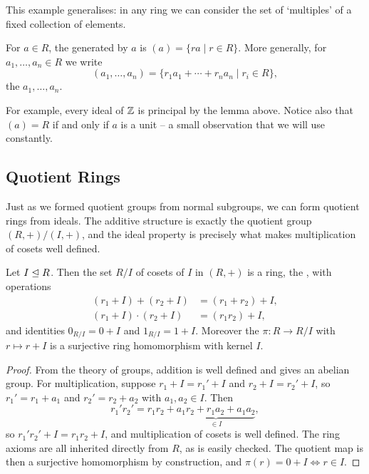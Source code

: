 \documentclass[a4paper]{scrartcl}
\begin{document}
This example generalises: in any ring we can consider the set of `multiples' of a fixed collection of elements.

\begin{definition}
	For $a \in R$, the  generated by $a$ is $(a) = \{ra \mid r \in R\}$. More generally, for $a_1, \dots, a_n \in R$ we write
	$$
	(a_1, \dots, a_n) = \{r_1 a_1 + \cdots + r_n a_n \mid r_i \in R\},
	$$
	the  $a_1, \dots, a_n$.
\end{definition}

For example, every ideal of $\mathbb{Z}$ is principal by the lemma above. Notice also that $(a) = R$ if and only if $a$ is a unit -- a small observation that we will use constantly.

\subsection{Quotient Rings}

Just as we formed quotient groups from normal subgroups, we can form quotient rings from ideals. The additive structure is exactly the quotient group $(R, +)/(I, +)$, and the ideal property is precisely what makes multiplication of cosets well defined.

\begin{theorem}
	Let $I \trianglelefteq R$. Then the set $R/I$ of cosets of $I$ in $(R, +)$ is a ring, the , with operations
	\begin{align*}
		(r_1 + I) + (r_2 + I) &= (r_1 + r_2) + I, \\
		(r_1 + I) \cdot (r_2 + I) &= (r_1 r_2) + I,
	\end{align*}
	and identities $0_{R/I} = 0 + I$ and $1_{R/I} = 1 + I$. Moreover the  $\pi: R \rightarrow R/I$ with $r \mapsto r + I$ is a surjective ring homomorphism with kernel $I$.
\end{theorem}
\begin{proof}
	From the theory of groups, addition is well defined and gives an abelian group. For multiplication, suppose $r_1 + I = r_1' + I$ and $r_2 + I = r_2' + I$, so $r_1' = r_1 + a_1$ and $r_2' = r_2 + a_2$ with $a_1, a_2 \in I$. Then
	$$
	r_1' r_2' = r_1 r_2 + \underbrace{a_1 r_2 + r_1 a_2 + a_1 a_2}_{\in I},
	$$
	so $r_1'r_2' + I = r_1 r_2 + I$, and multiplication of cosets is well defined. The ring axioms are all inherited directly from $R$, as is easily checked. The quotient map is then a surjective homomorphism by construction, and $\pi(r) = 0 + I \iff r \in I$.
\end{proof}
\end{document}
